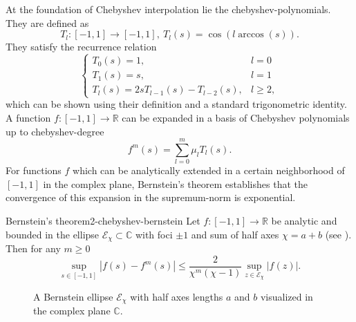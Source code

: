 At the foundation of Chebyshev interpolation lie the \glspl{chebyshev-polynomial}.
They are defined as \cite[chapter~3]{trefethen2019chebyshev}
\begin{equation}
    T_l: [-1, 1] \to [-1, 1],~T_l(s) = \cos(l \arccos(s)).
    \label{equ:2-chebyshev-chebyshev-definition}
\end{equation}
They satisfy the recurrence relation
\begin{equation}
    \begin{cases}
        T_0(s) = 1, & l = 0 \\
        T_1(s) = s, & l = 1 \\
        T_{l}(s) = 2s T_{l-1}(s) - T_{l-2}(s), & l \geq 2,
    \end{cases}
    \label{equ:2-chebyshev-chebyshev-recursion}
\end{equation}
which can be shown using their definition 
and a standard trigonometric identity.\\

A function $f:[-1, 1] \to \mathbb{R}$ can be expanded in a basis of Chebyshev
polynomials up to \gls{chebyshev-degree} \cite[chapter~3]{trefethen2019chebyshev}
\begin{equation}
    f^m(s) = \sum_{l=0}^m \mu_l T_l(s).
    \label{equ:2-chebyshev-chebyshev-expansion-general}
\end{equation}
For functions $f$ which can be analytically extended in a certain neighborhood
of $[-1, 1]$ in the complex plane, Bernstein's theorem \cite[theorem~4.3]{trefethen2008gauss}
establishes that the convergence of this expansion in the supremum-norm is
exponential.
\begin{theorem}{Bernstein's theorem}{2-chebyshev-bernstein}
    Let $f:[-1, 1] \to \mathbb{R}$ be analytic and bounded in the ellipse $\mathcal{E}_{\chi} \subset \mathbb{C}$
    with foci $\pm 1$ and sum of half axes $\chi = a + b$ (see ).
    Then for any $m \geq 0$
    \begin{equation}
        \sup_{s \in [-1, 1]} |f(s) - f^m(s)| \leq \frac{2}{\chi^m(\chi-1)} \sup_{z \in \mathcal{E}_{\chi}} |f(z)|.
        \label{equ:2-chebyshev-bernstein-convergence-result}
    \end{equation}
\end{theorem}

\begin{figure}[ht]
    \centering
    
    \caption{A Bernstein ellipse $\mathcal{E}_{\chi}$ with half axes lengths $a$ and
        $b$ visualized in the complex plane $\mathbb{C}$.}
    \label{fig:2-chebyshev-proof-bernstein-ellipse}
\end{figure}

